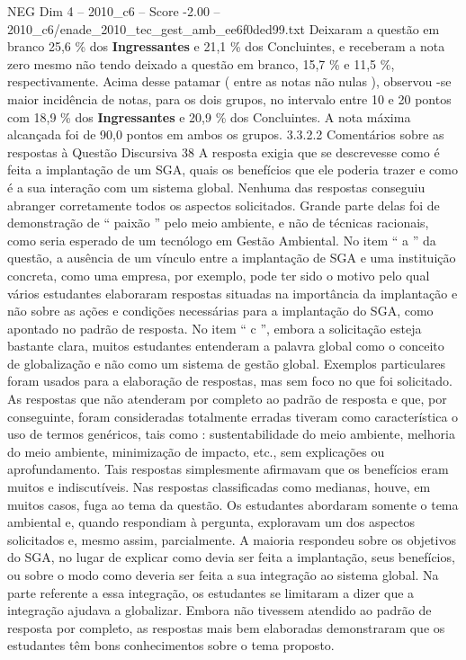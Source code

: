 \begin{textsample}{NEG Dim 4 – 2010\_c6 – Score -2.00 – 2010\_c6/enade\_2010\_tec\_gest\_amb\_ee6f0ded99.txt}
Deixaram a questão em branco 25,6 \% dos \textbf{Ingressantes} e 21,1 \% dos Concluintes, e receberam a nota zero mesmo não tendo deixado a questão em branco, 15,7 \% e 11,5 \%, respectivamente.
Acima desse patamar ( entre as notas não nulas ), observou -se maior incidência de notas, para os dois grupos, no intervalo entre 10 e 20 pontos com 18,9 \% dos \textbf{Ingressantes} e 20,9 \% dos Concluintes.
A nota máxima alcançada foi de 90,0 pontos em ambos os grupos. 3.3.2.2 Comentários sobre as respostas à Questão Discursiva 38 A resposta exigia que se descrevesse como é feita a implantação de um SGA, quais os benefícios que ele poderia trazer e como é a sua interação com um sistema global.
Nenhuma das respostas conseguiu abranger corretamente todos os aspectos solicitados.
Grande parte delas foi de demonstração de “ paixão ” pelo meio ambiente, e não de técnicas racionais, como seria esperado de um tecnólogo em Gestão Ambiental.
No item “ a ” da questão, a ausência de um vínculo entre a implantação de SGA e uma instituição concreta, como uma empresa, por exemplo, pode ter sido o motivo pelo qual vários estudantes elaboraram respostas situadas na importância da implantação e não sobre as ações e condições necessárias para a implantação do SGA, como apontado no padrão de resposta.
No item “ c ”, embora a solicitação esteja bastante clara, muitos estudantes entenderam a palavra global como o conceito de globalização e não como um sistema de gestão global.
Exemplos particulares foram usados para a elaboração de respostas, mas sem foco no que foi solicitado.
As respostas que não atenderam por completo ao padrão de resposta e que, por conseguinte, foram consideradas totalmente erradas tiveram como característica o uso de termos genéricos, tais como : sustentabilidade do meio ambiente, melhoria do meio ambiente, minimização de impacto, etc., sem explicações ou aprofundamento.
Tais respostas simplesmente afirmavam que os benefícios eram muitos e indiscutíveis.
Nas respostas classificadas como medianas, houve, em muitos casos, fuga ao tema da questão.
Os estudantes abordaram somente o tema ambiental e, quando respondiam à pergunta, exploravam um dos aspectos solicitados e, mesmo assim, parcialmente.
A maioria respondeu sobre os objetivos do SGA, no lugar de explicar como devia ser feita a implantação, seus benefícios, ou sobre o modo como deveria ser feita a sua integração ao sistema global.
Na parte referente a essa integração, os estudantes se limitaram a dizer que a integração ajudava a globalizar.
Embora não tivessem atendido ao padrão de resposta por completo, as respostas mais bem elaboradas demonstraram que os estudantes têm bons conhecimentos sobre o tema proposto.

\end{textsample}
